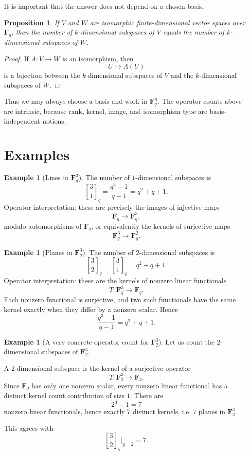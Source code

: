 \documentclass[11pt]{article}
\newtheorem{proposition}[theorem]{Proposition}
\theoremstyle{definition}
\newtheorem{example}[theorem]{Example}
\theoremstyle{remark}
\newcommand{\F}{\mathbf{F}}
\newcommand{\qbinom}[2]{\genfrac{[}{]}{0pt}{}{#1}{#2}_q}
\begin{document}
	It is important that the answer does not depend on a chosen basis.
	
	\begin{proposition}
		If \(V\) and \(W\) are isomorphic finite-dimensional vector spaces over \(\F_q\), then the number of \(k\)-dimensional subspaces of \(V\) equals the number of \(k\)-dimensional subspaces of \(W\).
	\end{proposition}
	
	\begin{proof}
		If \(A:V\to W\) is an isomorphism, then
		\[
		U\longmapsto A(U)
		\]
		is a bijection between the \(k\)-dimensional subspaces of \(V\) and the \(k\)-dimensional subspaces of \(W\).
	\end{proof}
	
	Thus we may always choose a basis and work in \(\F_q^n\). The operator counts above are intrinsic, because rank, kernel, image, and isomorphism type are basis-independent notions.
	
	\section{Examples}
	
	\begin{example}[Lines in \(\F_q^3\)]
		The number of \(1\)-dimensional subspaces is
		\[
		\qbinom{3}{1}
		=
		\frac{q^3-1}{q-1}
		=
		q^2+q+1.
		\]
		Operator interpretation: these are precisely the images of injective maps
		\[
		\F_q\to \F_q^3,
		\]
		modulo automorphisms of \(\F_q\), or equivalently the kernels of surjective maps
		\[
		\F_q^3\to \F_q^2.
		\]
	\end{example}
	
	\begin{example}[Planes in \(\F_q^3\)]
		The number of \(2\)-dimensional subspaces is
		\[
		\qbinom{3}{2}=\qbinom{3}{1}=q^2+q+1.
		\]
		Operator interpretation: these are the kernels of nonzero linear functionals
		\[
		T:\F_q^3\to \F_q.
		\]
		Each nonzero functional is surjective, and two such functionals have the same kernel exactly when they differ by a nonzero scalar. Hence
		\[
		\frac{q^3-1}{q-1}=q^2+q+1.
		\]
	\end{example}
	
	\begin{example}[A very concrete operator count for \(\F_2^3\)]
		Let us count the \(2\)-dimensional subspaces of \(\F_2^3\).
		
		A \(2\)-dimensional subspace is the kernel of a surjective operator
		\[
		T:\F_2^3\to \F_2.
		\]
		Since \(\F_2\) has only one nonzero scalar, every nonzero linear functional has a distinct kernel count contribution of size \(1\). There are
		\[
		2^3-1=7
		\]
		nonzero linear functionals, hence exactly \(7\) distinct kernels, i.e. \(7\) planes in \(\F_2^3\).
		
		This agrees with
		\[
		\qbinom{3}{2}\Big|_{q=2}=7.
		\]
	\end{example}
	
\end{document}
